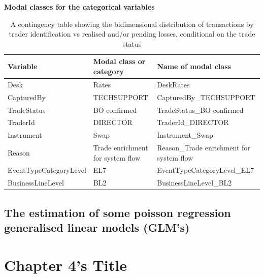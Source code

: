 \documentclass{DissertateUSU}
\begin{document}
\begin{table}[htbp]
        \centering
        \textbf{Modal classes for the categorical variables} 
\singlespacing        
        \small
        \setlength\tabcolsep{2pt}
            \begin{tabular}{|l|l|p{4cm}|} \hline
            Variable & Modal class or category & Name of modal class \\\hline
            Desk & Rates & DeskRates \\ \cline{1-3}
            CapturedBy & TECHSUPPORT & CapturedBy\_TECHSUPPORT \\ \cline{1-3}
            TradeStatus & BO confirmed & TradeStatus\_BO confirmed \\ \cline{1-3}
            TraderId & DIRECTOR & TraderId\_DIRECTOR \\ \cline{1-3}
            Instrument & Swap & Instrument\_Swap \\ \cline{1-3}
            Reason & Trade enrichment for system flow  & Reason\_Trade enrichment for system flow \\ \cline{1-3}
            EventTypeCategoryLevel & EL7 & EventTypeCategoryLevel\_EL7 \\ \cline{1-3}
            BusinessLineLevel & BL2 & BusinessLineLevel\_BL2 \\ \cline{1-3} 
            \end{tabular}
            \caption{A contingency table showing the bidimensional distribution of transactions by trader identification vs realised and/or pending losses, conditional on the trade status}
            \label{tab:Mosaic_Contingency}
\end{table}
\doublespacing

\section{The estimation of some poisson regression generalised linear models (GLM's)}
\label{sec:The estimation of some poisson regression generalised linear models (GLM's)}

\singlespacing

\FloatBarrier
\newpage
{}
\fancyhead[R]{\thepage}
\fancyfoot[C]{}

\chapter{Chapter 4's Title}

\FloatBarrier
\newpage
{}
\fancyhead[R]{\thepage}
\fancyfoot[C]{}
\end{document}
